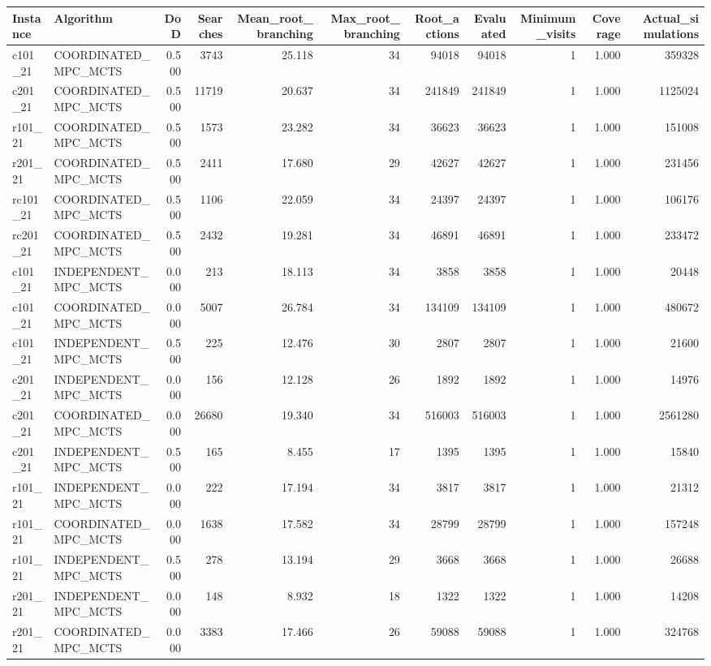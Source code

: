 \begin{tabular}{llrrrrrrrrr}
\toprule
Instance & Algorithm & DoD & Searches & Mean\_root\_branching & Max\_root\_branching & Root\_actions & Evaluated & Minimum\_visits & Coverage & Actual\_simulations \\
\midrule
c101\_21 & COORDINATED\_MPC\_MCTS & 0.500 & 3743 & 25.118 & 34 & 94018 & 94018 & 1 & 1.000 & 359328 \\
c201\_21 & COORDINATED\_MPC\_MCTS & 0.500 & 11719 & 20.637 & 34 & 241849 & 241849 & 1 & 1.000 & 1125024 \\
r101\_21 & COORDINATED\_MPC\_MCTS & 0.500 & 1573 & 23.282 & 34 & 36623 & 36623 & 1 & 1.000 & 151008 \\
r201\_21 & COORDINATED\_MPC\_MCTS & 0.500 & 2411 & 17.680 & 29 & 42627 & 42627 & 1 & 1.000 & 231456 \\
rc101\_21 & COORDINATED\_MPC\_MCTS & 0.500 & 1106 & 22.059 & 34 & 24397 & 24397 & 1 & 1.000 & 106176 \\
rc201\_21 & COORDINATED\_MPC\_MCTS & 0.500 & 2432 & 19.281 & 34 & 46891 & 46891 & 1 & 1.000 & 233472 \\
c101\_21 & INDEPENDENT\_MPC\_MCTS & 0.000 & 213 & 18.113 & 34 & 3858 & 3858 & 1 & 1.000 & 20448 \\
c101\_21 & COORDINATED\_MPC\_MCTS & 0.000 & 5007 & 26.784 & 34 & 134109 & 134109 & 1 & 1.000 & 480672 \\
c101\_21 & INDEPENDENT\_MPC\_MCTS & 0.500 & 225 & 12.476 & 30 & 2807 & 2807 & 1 & 1.000 & 21600 \\
c201\_21 & INDEPENDENT\_MPC\_MCTS & 0.000 & 156 & 12.128 & 26 & 1892 & 1892 & 1 & 1.000 & 14976 \\
c201\_21 & COORDINATED\_MPC\_MCTS & 0.000 & 26680 & 19.340 & 34 & 516003 & 516003 & 1 & 1.000 & 2561280 \\
c201\_21 & INDEPENDENT\_MPC\_MCTS & 0.500 & 165 & 8.455 & 17 & 1395 & 1395 & 1 & 1.000 & 15840 \\
r101\_21 & INDEPENDENT\_MPC\_MCTS & 0.000 & 222 & 17.194 & 34 & 3817 & 3817 & 1 & 1.000 & 21312 \\
r101\_21 & COORDINATED\_MPC\_MCTS & 0.000 & 1638 & 17.582 & 34 & 28799 & 28799 & 1 & 1.000 & 157248 \\
r101\_21 & INDEPENDENT\_MPC\_MCTS & 0.500 & 278 & 13.194 & 29 & 3668 & 3668 & 1 & 1.000 & 26688 \\
r201\_21 & INDEPENDENT\_MPC\_MCTS & 0.000 & 148 & 8.932 & 18 & 1322 & 1322 & 1 & 1.000 & 14208 \\
r201\_21 & COORDINATED\_MPC\_MCTS & 0.000 & 3383 & 17.466 & 26 & 59088 & 59088 & 1 & 1.000 & 324768 \\

\end{tabular}
